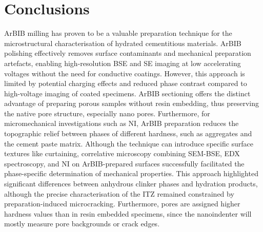 

\section{Conclusions}

\ac{ArBIB} milling has proven to be a valuable preparation technique for the microstructural characterisation of hydrated cementitious materials.
\ac{ArBIB} polishing effectively removes surface contaminants and mechanical preparation artefacts, enabling high-resolution \ac{BSE} and \ac{SE} imaging at low accelerating voltages without the need for conductive coatings.
However, this approach is limited by potential charging effects and reduced phase contrast compared to high-voltage imaging of coated specimens.
\ac{ArBIB} sectioning offers the distinct advantage of preparing porous samples without resin embedding, thus preserving the native pore structure, especially nano pores.
Furthermore, for micromechanical investigations such as \ac{NI}, \ac{ArBIB} preparation reduces the topographic relief between phases of different hardness, such as aggregates and the cement paste matrix.
Although the technique can introduce specific surface textures like curtaining, correlative microscopy combining \ac{SEM}-\ac{BSE}, \ac{EDX} spectroscopy, and \ac{NI} on \ac{ArBIB}-prepared surfaces successfully facilitated the phase-specific determination of mechanical properties.
This approach highlighted significant differences between anhydrous clinker phases and hydration products, although the precise characterisation of the \ac{ITZ} remained constrained by preparation-induced microcracking.
Furthermore, pores are assigned higher hardness values than in resin embedded specimens, since the nanoindenter will mostly measure pore backgrounds or crack edges.
